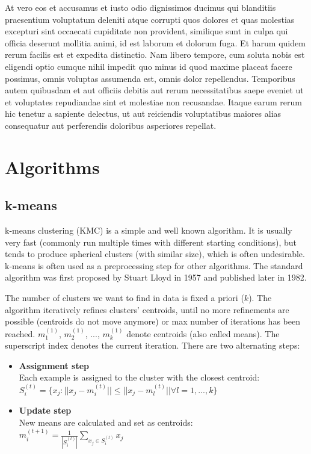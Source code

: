 \documentclass[]{IEEEphot}
\begin{document}
At vero eos et accusamus et iusto odio dignissimos ducimus qui blanditiis praesentium voluptatum deleniti atque corrupti quos dolores et quas molestias excepturi sint occaecati cupiditate non provident, similique sunt in culpa qui officia deserunt mollitia animi, id est laborum et dolorum fuga. Et harum quidem rerum facilis est et expedita distinctio. Nam libero tempore, cum soluta nobis est eligendi optio cumque nihil impedit quo minus id quod maxime placeat facere possimus, omnis voluptas assumenda est, omnis dolor repellendus. Temporibus autem quibusdam et aut officiis debitis aut rerum necessitatibus saepe eveniet ut et voluptates repudiandae sint et molestiae non recusandae. Itaque earum rerum hic tenetur a sapiente delectus, ut aut reiciendis voluptatibus maiores alias consequatur aut perferendis doloribus asperiores repellat.

\newpage
\section{Algorithms}
\subsection{k-means}
k-means clustering (KMC) is a simple and well known algorithm. It is usually very
fast (commonly run multiple times with different starting conditions), but tends
to produce spherical clusters (with similar size), which is often undesirable.
k-means is often used as a preprocessing step for other algorithms. The standard
algorithm was first proposed by Stuart Lloyd in 1957 and published later in 1982.

The number of clusters we want to find in data is fixed a priori ($k$).
The algorithm iteratively refines clusters' centroids,
until no more refinements are possible (centroids do not move anymore)
or max number of iterations has been reached. $m_1^{(1)}$, $m_2^{(1)}$, ..., $m_k^{(1)}$
denote centroids (also called means). The superscript index denotes the current iteration.
There are two alternating steps:

\begin{itemize}
\item \textbf{Assignment step}\\
  Each example is assigned to the cluster with the closest centroid:\\
  $S_i^{(t)} = \{x_j : ||x_j - m_i^{(t)}|| \le ||x_j - m_l^{(t)}|| \forall l = 1, ..., k\}$
\\
\item \textbf{Update step}\\
  New means are calculated and set as centroids:\\
  $m_i^{(t+1)} = \frac{1}{|S_i^{(t)}|} \displaystyle\sum\limits_{x_j \in S_i^{(t)}}{x_j}$
\end{itemize}
\end{document}
